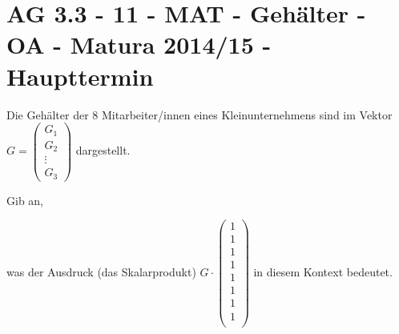 \section{AG 3.3 - 11 - MAT - Gehälter - OA - Matura 2014/15 - Haupttermin}

\begin{beispiel}[AG 3.3]{1} %
Die Gehälter der 8 Mitarbeiter/innen eines Kleinunternehmens sind im Vektor $G=\begin{pmatrix}
	G_1 \\
	G_2 \\
	\vdots \\
	G_3
\end{pmatrix}$ dargestellt. \leer

Gib an,

was der Ausdruck (das Skalarprodukt) \footnotesize $G\cdot \begin{pmatrix}
	1\\
	1\\
	1\\
	1\\
	1\\
	1\\
	1\\
	1\\
	\end{pmatrix}$ \normalsize in diesem Kontext \mbox{bedeutet}. 


\end{beispiel}